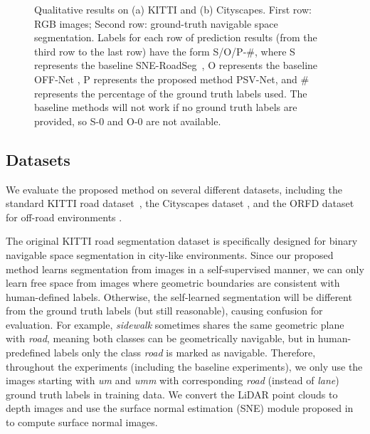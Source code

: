 \documentclass[letterpaper, 10 pt, journal, twoside]{ieeetran}
\begin{document}
\begin{figure*} \vspace{7pt}
{
  \centering
  \caption{\small Qualitative results on (a) KITTI and (b) Cityscapes. First row: RGB images; Second row: ground-truth navigable space segmentation. Labels for each row of prediction results (from the third row to the last row) have the form S/O/P-$\#$, where S represents the baseline SNE-RoadSeg~\cite{fan2020sne}, O represents the baseline OFF-Net \cite{min2022orfd}, P represents the proposed method PSV-Net, and $\#$ represents the percentage of the  ground truth labels used. The baseline methods will not work if no ground truth labels are provided, so S-0 and O-0 are not available.
  } 
\label{fig:quals}  
}
\end{figure*}

\subsection{Datasets}
We evaluate the proposed method on several different datasets, including the standard KITTI road dataset~\cite{fritsch2013new}, the Cityscapes dataset \cite{cordts2015cityscapes}, and the ORFD dataset for off-road environments \cite{min2022orfd}.

The original KITTI road segmentation dataset \cite{cordts2015cityscapes} is specifically designed for binary navigable space segmentation in city-like environments. Since our proposed method learns  segmentation from images in a self-supervised manner, we can only learn free space from  images where geometric boundaries are consistent with human-defined labels. Otherwise, the self-learned segmentation will be different from the ground truth labels (but still reasonable), causing confusion for evaluation. For example, \textit{sidewalk} sometimes shares the same geometric plane with  \textit{road}, meaning both classes can be geometrically navigable, but in human-predefined labels only the class  \textit{road} is marked as navigable.  
Therefore, throughout the experiments (including the baseline experiments), we only use the images starting with \textit{um} and \textit{umm} with corresponding \textit{road} (instead of \textit{lane}) ground truth labels in training data. We convert the LiDAR point clouds to depth images and use the surface normal estimation (SNE) module proposed in \cite{fan2020sne} to compute surface normal images.
\end{document}
